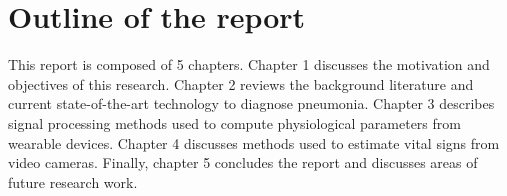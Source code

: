 \section{Outline of the report}

This report is composed of 5 chapters. Chapter 1 discusses the motivation and objectives of this research. Chapter 2 reviews the background literature and current state-of-the-art technology to diagnose pneumonia. Chapter 3 describes signal processing methods used to compute physiological parameters from wearable devices. Chapter 4 discusses methods used to estimate vital signs from video cameras. Finally, chapter 5 concludes the report and discusses areas of future research work.

